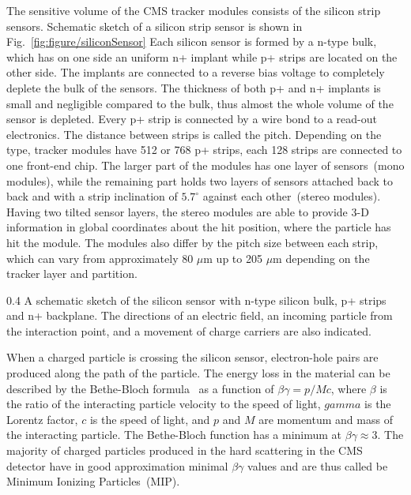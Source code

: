 The sensitive volume of the CMS tracker modules consists of the silicon strip sensors. Schematic sketch of a silicon strip sensor is shown in Fig.~\ref{fig:figure/siliconSensor} Each silicon sensor is formed by a n-type bulk, which has on one side an uniform n+ implant while p+ strips are located on the other side. The implants are connected to a reverse bias voltage to completely deplete the bulk of the sensors. The thickness of both p+ and n+ implants is small and negligible compared to the bulk, thus almost the whole volume of the sensor is depleted. Every p+ strip is connected by a wire bond to a read-out electronics. The distance between strips is called the pitch. Depending on the type, tracker modules have 512 or 768 p+ strips, each 128 strips are connected to one front-end chip. The larger part of the modules has one layer of sensors~(mono modules), while the remaining part holds two layers of sensors attached back to back and with a strip inclination of $5.7^{\circ}$ against each other~(stereo modules). Having two tilted sensor layers, the stereo modules are able to provide 3-D information in global coordinates about the hit position, where the particle has hit the module. The modules also differ by the pitch size between each strip, which can vary from approximately 80 $\mu$m up to 205 $\mu$m depending on the tracker layer and partition.

                 {0.4}       %
                 {A schematic sketch of the silicon sensor with n-type silicon bulk, p+ strips and n+ backplane. The directions of an electric field, an incoming particle from the interaction point, and a movement of charge carriers are also indicated. } %

When a charged particle is crossing the silicon sensor, electron-hole pairs are produced along the path of the particle. The energy loss in the material can be described by the Bethe-Bloch formula~\cite{Groom:2000sm} as a function of $\beta\gamma = p/Mc$, where $\beta$ is the ratio of the interacting particle velocity to the speed of light, $gamma$ is the Lorentz factor, $c$ is the speed of light, and $p$ and $M$ are momentum and mass of the interacting particle. The Bethe-Bloch function has a minimum at $\beta\gamma \approx 3$. The majority of charged particles produced in the hard scattering in the CMS detector have in good approximation minimal $\beta\gamma$ values and are thus called be Minimum Ionizing Particles~(MIP).

